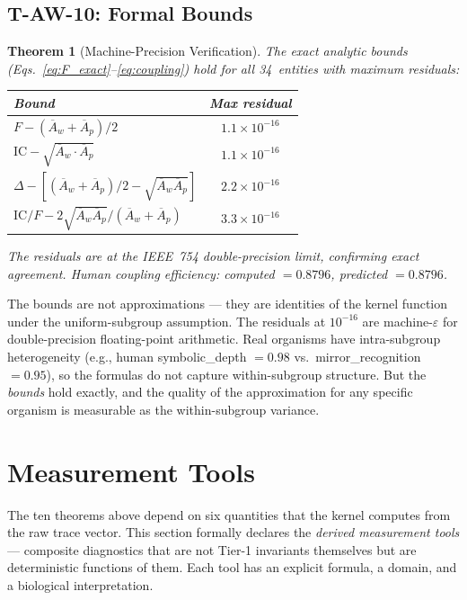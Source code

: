 \documentclass[
  aps,
  prd,
  twocolumn,
  superscriptaddress,
  nofootinbib,
  floatfix
]{revtex4-2}
\newtheorem{theorem}{Theorem}
\newcommand{\eps}{\varepsilon}
\newcommand{\IC}{\mathrm{IC}}
\newcommand{\Aw}{\overline{A}_{\!w}}
\newcommand{\Ap}{\overline{A}_{\!p}}
\begin{document}
\subsection{T-AW-10: Formal Bounds}

\begin{theorem}[Machine-Precision Verification]%
\label{thm:TAW10}
The exact analytic bounds
(Eqs.~\ref{eq:F_exact}--\ref{eq:coupling}) hold for all
34~entities with maximum residuals:
\begin{center}
\begin{tabular}{lc}
\toprule
Bound & Max residual \\
\midrule
$F - (\Aw + \Ap)/2$ & $1.1 \times 10^{-16}$ \\
$\IC - \sqrt{\Aw \cdot \Ap}$ & $1.1 \times 10^{-16}$ \\
$\Delta - [(\Aw+\Ap)/2 - \sqrt{\Aw\Ap}]$
  & $2.2 \times 10^{-16}$ \\
$\IC/F - 2\sqrt{\Aw\Ap}/(\Aw+\Ap)$
  & $3.3 \times 10^{-16}$ \\
\bottomrule
\end{tabular}
\end{center}
The residuals are at the IEEE~754 double-precision limit,
confirming exact agreement.  Human coupling efficiency:
computed $= 0.8796$, predicted $= 0.8796$.
\end{theorem}

The bounds are not approximations --- they are identities
of the kernel function under the uniform-subgroup assumption.
The residuals at $10^{-16}$ are machine-$\eps$ for
double-precision floating-point arithmetic.  Real organisms
have intra-subgroup heterogeneity (e.g., human symbolic\_depth
$= 0.98$ vs.\ mirror\_recognition $= 0.95$), so the formulas
do not capture within-subgroup structure.  But the
\emph{bounds} hold exactly, and the quality of the
approximation for any specific organism is measurable as
the within-subgroup variance.

\section{Measurement Tools}\label{sec:tools}

The ten theorems above depend on six quantities that
the kernel computes from the raw trace vector.  This
section formally declares the \emph{derived measurement
tools} --- composite diagnostics that are not Tier-1
invariants themselves but are deterministic functions of
them.  Each tool has an explicit formula, a domain, and
a biological interpretation.
\end{document}
